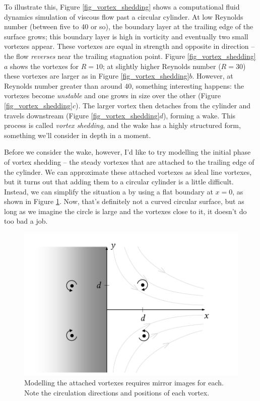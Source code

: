 To illustrate this, Figure \ref{fig_vortex_shedding} shows a computational fluid dynamics simulation of viscous flow past a circular cylinder.  At low Reynolds number (between five to 40 or so), the boundary layer at the trailing edge of the surface grows; this boundary layer is high in vorticity and eventually two small vortexes appear.  These vortexes are equal in strength and opposite in direction -- the flow \emph{reverses} near the trailing stagnation point.  Figure \ref{fig_vortex_shedding}$a$ shows the vortexes for $R = 10$; at slightly higher Reynolds number ($R = 30$) these vortexes are larger as in Figure \ref{fig_vortex_shedding}$b$.  However, at Reynolds number greater than around 40, something interesting happens:  the vortexes become \emph{unstable} and one grows in size over the other (Figure \ref{fig_vortex_shedding}$c$).  The larger vortex then detaches from the cylinder and travels downstream (Figure \ref{fig_vortex_shedding}$d$), forming a wake.  This process is called \emph{vortex shedding}, and the wake has a highly structured form, something we'll consider in depth in a moment.  

Before we consider the wake, however, I'd like to try modelling the initial phase of vortex shedding -- the steady vortexes that are attached to the trailing edge of the cylinder.  We can approximate these attached vortexes as ideal line vortexes, but it turns out that adding them to a circular cylinder is a little difficult.  Instead, we can simplify the situation a by using a flat boundary at $x = 0$, as shown in Figure \ref{fig_attached_vortex1}.  Now, that's definitely not a curved circular surface, but as long as we imagine the circle is large and the vortexes close to it, it doesn't do too bad a job.

\begin{figure}
\centering\includegraphics[width=0.75\linewidth]{Figures/Chapter4/fig_attached_vortex1}
\caption{Modelling the attached vortexes requires mirror images for each.  Note the circulation directions and positions of each vortex.}
\label{fig_attached_vortex1}
\end{figure}

